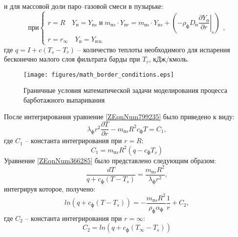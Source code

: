 и для массовой доли паро--газовой смеси в пузырьке:
\begin{displaymath}
при \left\{ \begin{array}{l}
r{ =}R\quad Y_{{ п}}{ =}Y_{{ п}s}\; и\; m_{{ п}s}\cdot Y_{{ п}r}{ =}m_{{ п}s}\cdot Y_{{ п}s}{ +}\left({ -}{\rho }_{{ ф}}D_{{ п}}{\left.\dfrac{\partial Y_{{ п}}}{\partial r}\right|}_s\right) \\ 
r{ =}r_{\infty }\quad Y_{{ п}}{ =}Y_{{ п}\infty } \end{array}
\right., \label{ZEqnNum881958}
\end{displaymath}
где $q{ =}I{ +}c\left(T_{{ s}}{ -}T_r\right)$ -- количество теплоты необходимого для испарения бесконечно малого слоя фильтрата барды при $T_r$, ${{ кДж}}/{{ кмоль}}$.

\begin{figure}[htb]
\center
\texttt{[image: figures/math\_border\_conditions.eps]}
\caption{Граничные условия математической задачи моделирования процесса барботажного выпаривания}\label{fig:math_border_conditions}
\end{figure}

После интегрирования уравнение \eqref{ZEqnNum799235} было приведено к виду:
\begin{equation} \label{ZEqnNum366285} 
{\lambda }_{{ ф}}r^{{ 2}}\frac{\partial T}{\partial r}{ -}m_{{ п}s}R^{{ 2}}c_{{ ф}}T{ =}C_{{ 1}},  
\end{equation} 
где $C_{{ 1}}$ -- константа интегрирования при $r{ =}R$:
\begin{equation} \label{6)} 
C_{{ 1}}{ =}m_{{ п}s}R^{{ 2}}\left(q{ -}c_{{ ф}}T_{{ s}}\right) 
\end{equation} 
Уравнение \eqref{ZEqnNum366285} было представлено следующим образом:
\begin{equation} \label{7)} 
\frac{dT}{q{ +}c_{{ ф}}\left(T{ -}T_{{ s}}\right)}{ =}\frac{m_{{ п}s}R^{{ 2}}}{{\lambda }_{{ ф}}r^{{ 2}}},  
\end{equation} 
интегрируя которое, получено:
\begin{equation} \label{ZEqnNum555366} 
{ ln}\left(q{ +}c_{{ ф}}\left(T{ -}T_{{ s}}\right)\right){ =-}\frac{m_{{ п}s}R^{{ 2}}}{{\rho }_{{ ф}}{\alpha }_{{ ф}}}\frac{{ 1}}{r}{ +}C_{{ 2}},  
\end{equation} 
где $C_{{ 2}}$ -- константа интегрирования при $r{ =}\infty $:
\begin{equation} \label{9)} 
C_{{ 2}}{ =ln}\left(q{ +}c_{{ ф}}\left(T_{\infty }{ -}T_{{ s}}\right)\right) 
\end{equation} 

